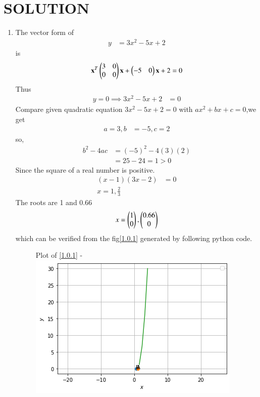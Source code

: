 \documentclass[journal,12pt,twocolumn]{IEEEtran}
\begin{document}
\section{SOLUTION}  
\begin{enumerate}
\item
The vector form of
\begin{align}
y&=3x^2-5x+2
\end{align}
is
\begin{align}
\mathbf{x}^T \begin{pmatrix}3 & 0\\0 & 0\end{pmatrix}\mathbf{x}+ \begin{pmatrix}-5 & 0\end{pmatrix}\mathbf{x}+2=0
\end{align}
Thus
\begin{align}
y=0\implies3x^2-5x+2 &=0
\end{align}
%
Compare given quadratic equation  $3x ^2 -5x +2 = 0$ with $ax^2 + bx + c = 0$,we get
\begin{align}
a=3,b&=-5,c=2
\end{align}
so,
\begin{align}
b^2-4ac&=(-5)^2-4(3)(2)\\
&=25-24=1>0
\end{align}
Since the square of a real number is positive. 
\begin{align}
 (x-1)(3x-2) &=0 \\
 x=1, \frac{2}{3}
\end{align}
The roots are 1 and 0.66
\begin{align}
 x=\begin{pmatrix}1\\0\end{pmatrix},\begin{pmatrix}0.66\\0\end{pmatrix} 
\end{align}
%
which can be verified from the fig\eqref{1.0.1} generated by following python code.
%
\begin{figure}[ht!]
Plot of \eqref{1.0.1} -
    \centering
    \includegraphics[width=\columnwidth]{figure5.png}

\end{figure}
\end{enumerate}
\end{document}
